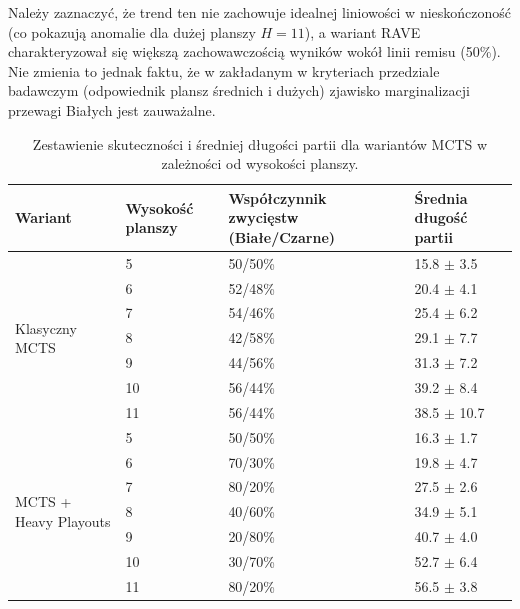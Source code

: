 \documentclass{article}
\begin{document}
Należy zaznaczyć, że trend ten nie zachowuje idealnej liniowości w nieskończoność (co pokazują anomalie dla dużej planszy $H=11$), a wariant RAVE charakteryzował się większą zachowawczością wyników wokół linii remisu (50\%). Nie zmienia to jednak faktu, że w zakładanym w kryteriach przedziale badawczym (odpowiednik plansz średnich i dużych) zjawisko marginalizacji przewagi Białych jest zauważalne.

\begin{table}[H]
    \centering
    \caption{Zestawienie skuteczności i średniej długości partii dla wariantów MCTS w zależności od wysokości planszy.}
    \label{tab:h4-summary}
    \renewcommand{\arraystretch}{1.2}

    \begin{tabular}{|p{1.5cm}|p{1.8cm}|p{2.7cm}|p{2.1cm}|}
        \hline
        \textbf{Wariant} & \textbf{Wysokość planszy} & \textbf{Współczynnik zwycięstw (Białe/Czarne)} & \textbf{Średnia długość partii} \\
        \hline

        \multirow{7}{1.5cm}{Klasyczny MCTS}
            & \hfill 5  & \hfill 50/50\% & \hfill 15.8 $\pm$ 3.5 \\
            & \hfill 6  & \hfill 52/48\% & \hfill 20.4 $\pm$ 4.1 \\
            & \hfill 7  & \hfill 54/46\% & \hfill 25.4 $\pm$ 6.2 \\
            & \hfill 8  & \hfill 42/58\% & \hfill 29.1 $\pm$ 7.7 \\
            & \hfill 9  & \hfill 44/56\% & \hfill 31.3 $\pm$ 7.2 \\
            & \hfill 10 & \hfill 56/44\% & \hfill 39.2 $\pm$ 8.4 \\
            & \hfill 11 & \hfill 56/44\% & \hfill 38.5 $\pm$ 10.7 \\
        \hline
        
        \multirow{7}{1.5cm}{MCTS + Heavy Playouts}
            & \hfill 5  & \hfill 50/50\% & \hfill 16.3 $\pm$ 1.7 \\
            & \hfill 6  & \hfill 70/30\% & \hfill 19.8 $\pm$ 4.7 \\
            & \hfill 7  & \hfill 80/20\% & \hfill 27.5 $\pm$ 2.6 \\
            & \hfill 8  & \hfill 40/60\% & \hfill 34.9 $\pm$ 5.1 \\
            & \hfill 9  & \hfill 20/80\% & \hfill 40.7 $\pm$ 4.0 \\
            & \hfill 10 & \hfill 30/70\% & \hfill 52.7 $\pm$ 6.4 \\
            & \hfill 11 & \hfill 80/20\% & \hfill 56.5 $\pm$ 3.8 \\
        \hline



\end{tabular}
\end{table}
\end{document}
